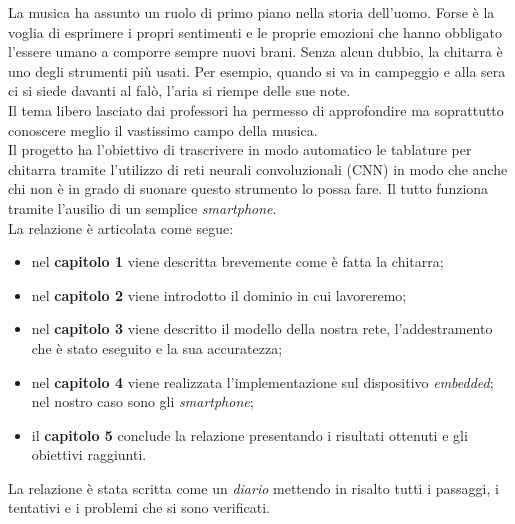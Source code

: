 La musica ha assunto un ruolo di primo piano nella storia dell'uomo. Forse è la voglia di esprimere i propri sentimenti e le proprie emozioni che hanno obbligato l'essere umano a comporre sempre nuovi brani. Senza alcun dubbio, la chitarra è uno degli strumenti più usati. Per esempio, quando si va in campeggio e alla sera ci si siede davanti al falò, l'aria si riempe delle sue note.\\ Il tema libero lasciato dai professori ha permesso di approfondire ma soprattutto conoscere meglio il vastissimo campo della musica.  \\ Il progetto ha l'obiettivo di trascrivere in modo automatico le tablature per chitarra tramite l'utilizzo di reti neurali convoluzionali (CNN) in modo che anche chi non è in grado di suonare questo strumento lo possa fare. Il tutto funziona tramite l'ausilio di un semplice \textit{smartphone}. \\

La relazione è articolata come segue:
\begin{itemize}
	\item nel \textbf{capitolo 1} viene descritta brevemente come è fatta la chitarra;
	\item nel \textbf{capitolo 2} viene introdotto il dominio in cui lavoreremo;
	\item nel \textbf{capitolo 3} viene descritto il modello della nostra rete, l'addestramento che è stato eseguito e la sua accuratezza;
	\item nel \textbf{capitolo 4} viene realizzata l'implementazione sul dispositivo \textit{embedded}; nel nostro caso sono gli \textit{smartphone};
	\item il \textbf{capitolo 5} conclude la relazione presentando i risultati ottenuti e gli obiettivi raggiunti.
\end{itemize}
La relazione è stata scritta come un \textit{diario} mettendo in risalto tutti i passaggi, i tentativi e i problemi che si sono verificati.